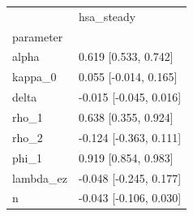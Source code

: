\begin{tabular}{ll}
\toprule
 & hsa\_steady \\
parameter &  \\
\midrule
alpha & 0.619 [0.533, 0.742] \\
kappa\_0 & 0.055 [-0.014, 0.165] \\
delta & -0.015 [-0.045, 0.016] \\
rho\_1 & 0.638 [0.355, 0.924] \\
rho\_2 & -0.124 [-0.363, 0.111] \\
phi\_1 & 0.919 [0.854, 0.983] \\
lambda\_ez & -0.048 [-0.245, 0.177] \\
n & -0.043 [-0.106, 0.030] \\
\bottomrule
\end{tabular}

